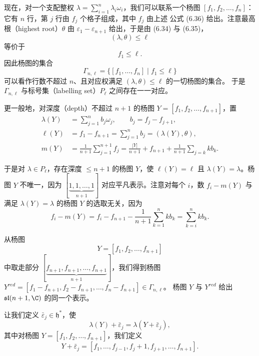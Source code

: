 现在，对一个支配整权 $\lambda=\sum_{i=1}^n\lambda_i\omega_i$，我们可以联系一个杨图
$[f_1,f_2,\dots,f_n]$：它有 $n$ 行，第 $j$ 行由 $f_j$ 个格子组成，其中 $f_j$ 由上述
公式 (6.36) 给出。注意最高根（highest root）$\theta$ 由 $\varepsilon_1-\varepsilon_{n+1}$
给出，于是由 (6.34) 与 (6.35)，
\[
(\lambda,\theta)\le\ell
\]
等价于
\[
f_1\le\ell.
\]
因此杨图的集合
\[
\Gamma_{n,\ell}=\{[f_1,\dots,f_n]\mid f_1\le\ell\}
\]
可以看作行数不超过 $n$、且对应权满足 $(\lambda,\theta)\le\ell$ 的一切杨图的集合。
于是 $\Gamma_{n,\ell}$ 与标号集（labelling set）$P_\ell$ 之间存在一一对应。

更一般地，对深度（depth）不超过 $n+1$ 的杨图 $Y=[f_1,f_2,\dots,f_{n+1}]$，置
\[
\begin{aligned}
\lambda(Y)&=\sum_{j=1}^n b_j\omega_j,\qquad b_j=f_j-f_{j+1},\\
\ell(Y)&=f_1-f_{n+1}=\sum_{j=1}^n b_j=(\lambda(Y),\theta),\\
m(Y)&=\frac{1}{n+1}\sum_{j=1}^{n+1}f_j
=\frac{|Y|}{n+1}+f_{n+1}+\frac{1}{n+1}\sum_{j=k} kb_k.
\end{aligned}
\]

于是对 $\lambda\in P_\ell$，存在深度 $\le n+1$ 的杨图 $Y$，使 $\ell(Y)=\ell$ 且
$\lambda(Y)=\lambda$。杨图 $Y$ 不唯一，因为
$[\underbrace{1,1,\dots,1}_{n+1}]$ 对应平凡表示。注意对每个 $i$，数 $f_i-m(Y)$
与满足 $\lambda(Y)=\lambda$ 的杨图 $Y$ 的选取无关，因为
\[
f_i-m(Y)=f_i-f_{n+1}-\frac{1}{n+1}\sum_{k=1}^n kb_k=\sum_{k=i}^n kb_k.
\]

从杨图
\[
Y=[f_1,f_2,\dots,f_{n+1}]
\]
中取走部分 $[\underbrace{f_{n+1},f_{n+1},\dots,f_{n+1}}_{n+1}]$，我们得到杨图
$Y^{red}=[f_1-f_{n+1},f_2-f_{n+1},\dots,f_n-f_{n+1}]\in\Gamma_{n,\ell}$。
杨图 $Y$ 与 $Y^{red}$ 给出 $\mathfrak{sl}(n+1,\C)$ 的同一个表示。

让我们定义 $\bar\varepsilon_j\in\mathfrak{h}^*$，使
\[
\lambda(Y)+\bar\varepsilon_j=\lambda(Y+\bar\varepsilon_j),
\]
其中对杨图 $Y=[f_1,f_2,\dots,f_{n+1}]$，我们定义
\[
Y+\bar\varepsilon_j=[f_1,\dots,f_{j-1},f_j+1,f_{j+1},\dots,f_{n+1}].
\]

